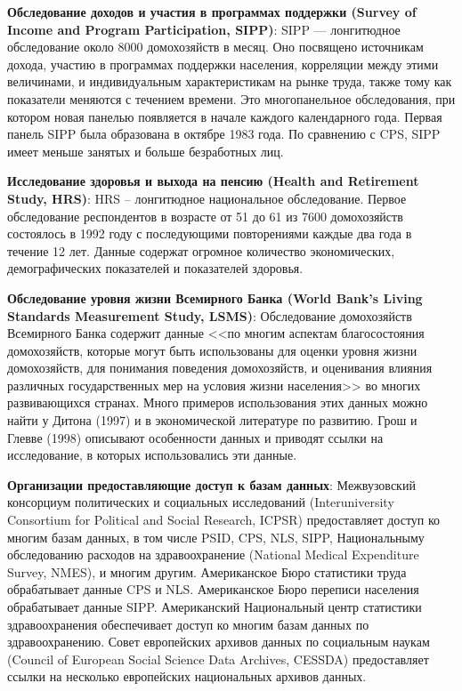 {\bf Обследование доходов и участия в программах поддержки (Survey of Income and Program Participation, SIPP)}: SIPP --- лонгитюдное обследование около 8000 домохозяйств в месяц. Оно посвящено источникам дохода, участию в  программах поддержки населения, корреляции между этими величинами, и индивидуальным характеристикам на рынке труда, также тому как показатели меняются с течением времени. Это многопанельное обследования, при котором новая панелью появляется в начале каждого календарного года. Первая панель SIPP была образована в октябре 1983 года. По сравнению с CPS, SIPP имеет меньше занятых и больше безработных лиц.


{\bf Исследование здоровья и выхода на пенсию (Health and Retirement Study, HRS)}: HRS -- лонгитюдное национальное обследование. Первое обследование респондентов в возрасте от 51 до 61 из 7600 домохозяйств состоялось в 1992 году  с последующими повторениями каждые два года в течение 12 лет. Данные содержат огромное количество экономических, демографических показателей и показателей здоровья.


{\bf Обследование уровня жизни Всемирного Банка (World Bank’s Living Standards Measurement Study, LSMS)}: Обследование домохозяйств Всемирного Банка содержит данные  <<по многим аспектам благосостояния домохозяйств, которые могут быть использованы для оценки уровня жизни домохозяйств, для понимания поведения домохозяйств, и оценивания влияния различных государственных мер на условия жизни населения>> во многих развивающихся странах. Много примеров использования этих данных можно найти у Дитона (1997) и в экономической литературе по развитию. Грош и Глевве (1998) описывают особенности данных и приводят ссылки на исследование, в которых использовались эти данные.


{\bf Организации предоставляющие доступ к базам данных}: Межвузовский консорциум политических и социальных исследований (Interuniversity Consortium for Political and Social Research, ICPSR) предоставляет доступ ко многим базам данных, в том числе PSID, CPS, NLS, SIPP, Национальныму обследованию расходов на здравоохранение (National Medical Expenditure Survey, NMES), и многим другим. Американское Бюро статистики труда обрабатывает данные CPS и NLS. Американское Бюро переписи населения обрабатывает данные SIPP. Американский Национальный центр статистики здравоохранения обеспечивает доступ ко многим базам данных по здравоохранению.  Совет европейских архивов данных по социальным наукам (Council of European Social Science Data Archives, CESSDA) предоставляет ссылки на несколько европейских национальных архивов данных.

